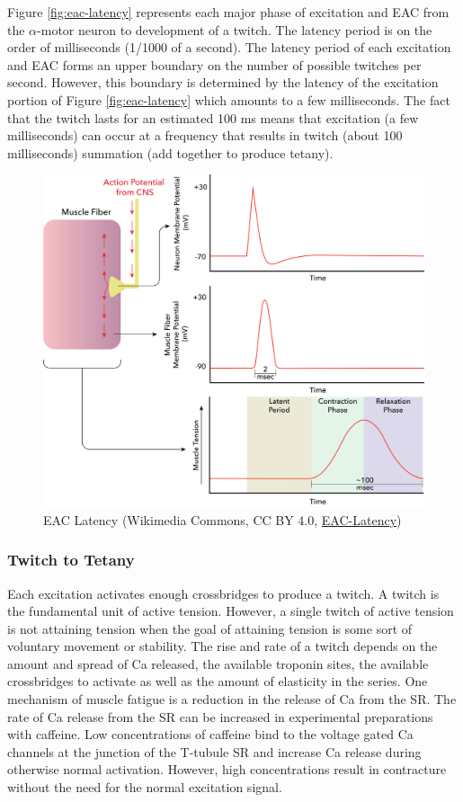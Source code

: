 Figure \ref{fig:eac-latency} represents each major phase of excitation and EAC from the $\alpha$-motor neuron to development of a twitch. The latency period is on the order of milliseconds (1/1000 of a second). The latency period of each excitation and EAC forms an upper boundary on the number of possible twitches per second. However, this boundary is determined by the latency of the excitation portion of Figure \ref{fig:eac-latency} which amounts to a few milliseconds. The fact that the twitch lasts for an estimated 100 ms means that excitation (a few milliseconds) can occur at a frequency that results in twitch (about 100 milliseconds) summation (add together to produce tetany).
\begin{figure}[!ht]
    \centering
    \includegraphics[width=1\linewidth]{./figure/eac-latency.png}
    \caption{EAC Latency \footnotesize{(Wikimedia Commons, CC BY 4.0, \href{https://commons.wikimedia.org/wiki/File:The_latent_period_between_the_muscle_action_potential_and_contraction.png}{EAC-Latency})}}
    \label{fig:Motoneuron}
\end{figure}

\subsubsection{Twitch to Tetany}
Each excitation activates enough crossbridges to produce a twitch. A twitch is the fundamental unit of active tension. However, a single twitch of active tension is not attaining tension when the goal of attaining tension is some sort of voluntary movement or stability. The rise and rate of a twitch depends on the amount and spread of Ca released, the available troponin sites, the available crossbridges to activate as well as the amount of elasticity in the series. One mechanism of muscle fatigue is a reduction in the release of Ca from the SR. The rate of Ca release from the SR can be increased in experimental preparations with caffeine. Low concentrations of caffeine bind to the voltage gated Ca channels at the junction of the T-tubule SR and increase Ca release during otherwise normal activation. However, high concentrations result in contracture without the need for the normal excitation signal. 


